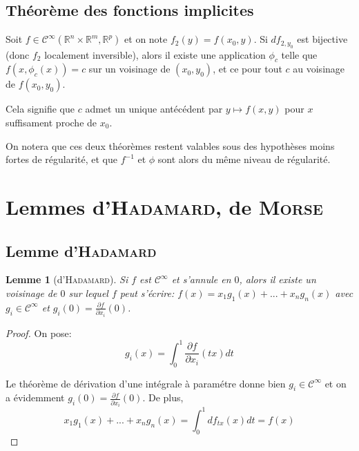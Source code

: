 \documentclass[a4paper]{article}
\newcommand{\cinf}{\mathcal{C}^\infty}
\newcommand{\R}{\mathbb{R}}
\newtheorem{lemm}{Lemme}
\theoremstyle{definition}
\begin{document}
\subsection{Théorème des fonctions implicites}

Soit $f\in\cinf(\R^n\times\R^m,\R^p)$ et on note $f_2(y) = f(x_0, y)$.
Si $df_{2,y_0}$ est bijective (donc $f_2$ localement inversible), alors il existe une application $\phi_c$ telle que $f(x,\phi_c(x))=c$ sur un voisinage de $(x_0,y_0)$, et ce pour tout $c$ au voisinage de $f(x_0,y_0)$.

Cela signifie que $c$ admet un unique antécédent par $y\mapsto f(x,y)$ pour $x$ suffisament proche de $x_0$.

\bigskip

On notera que ces deux théorèmes restent valables sous des hypothèses moins fortes de régularité, et que $f^{-1}$ et $\phi$ sont alors du même niveau de régularité.

\section{Lemmes d'\textsc{Hadamard}, de \textsc{Morse}}

\subsection{Lemme d'\textsc{Hadamard}}
\begin{lemm}[d'\textsc{Hadamard}]
	Si $f$ est $\cinf$ et s'annule en $0$, alors il existe un voisinage de $0$ sur lequel $f$ peut s'écrire: $f(x)=x_1g_1(x)+...+x_ng_n(x)$ avec $g_i\in\cinf$ et $g_i(0) = \frac{\partial f}{\partial x_i}(0)$.
\end{lemm}
\begin{proof}
	On pose:
	$$g_i(x) = \int_0^1 \frac{\partial f}{\partial x_i}(tx)dt$$

	Le théorème de dérivation d'une intégrale à paramétre donne bien $g_i\in\cinf$ et on a évidemment $g_i(0) = \frac{\partial f}{\partial x_i}(0)$.
	De plus,
	$$x_1g_1(x)+...+x_ng_n(x)=\int_0^1 df_{tx}(x) dt = f(x)$$
\end{proof}
\end{document}
